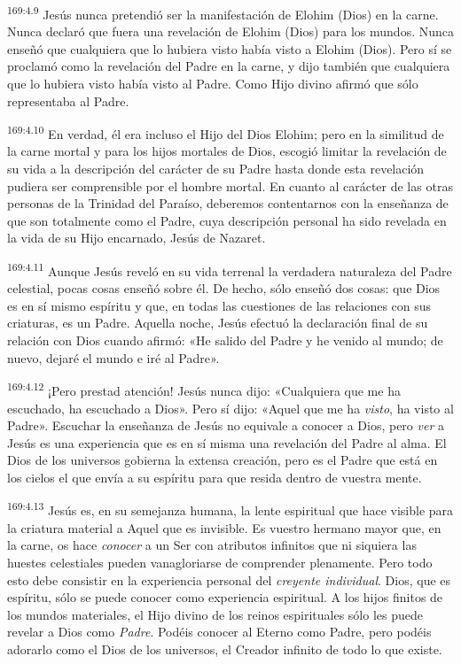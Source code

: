 \par 
\textsuperscript{169:4.9} Jesús nunca pretendió ser la manifestación de Elohim (Dios) en la carne. Nunca declaró que fuera una revelación de Elohim (Dios) para los mundos. Nunca enseñó que cualquiera que lo hubiera visto había visto a Elohim (Dios). Pero sí se proclamó como la revelación del Padre en la carne, y dijo también que cualquiera que lo hubiera visto había visto al Padre. Como Hijo divino afirmó que sólo representaba al Padre.

\par 
\textsuperscript{169:4.10} En verdad, él era incluso el Hijo del Dios Elohim; pero en la similitud de la carne mortal y para los hijos mortales de Dios, escogió limitar la revelación de su vida a la descripción del carácter de su Padre hasta donde esta revelación pudiera ser comprensible por el hombre mortal. En cuanto al carácter de las otras personas de la Trinidad del Paraíso, deberemos contentarnos con la enseñanza de que son totalmente como el Padre, cuya descripción personal ha sido revelada en la vida de su Hijo encarnado, Jesús de Nazaret.

\par 
\textsuperscript{169:4.11} Aunque Jesús reveló en su vida terrenal la verdadera naturaleza del Padre celestial, pocas cosas enseñó sobre él. De hecho, sólo enseñó dos cosas: que Dios es en sí mismo espíritu y que, en todas las cuestiones de las relaciones con sus criaturas, es un Padre. Aquella noche, Jesús efectuó la declaración final de su relación con Dios cuando afirmó: «He salido del Padre y he venido al mundo; de nuevo, dejaré el mundo e iré al Padre».

\par 
\textsuperscript{169:4.12} ¡Pero prestad atención! Jesús nunca dijo: «Cualquiera que me ha escuchado, ha escuchado a Dios». Pero sí dijo: «Aquel que me ha \textit{visto}, ha visto al Padre». Escuchar la enseñanza de Jesús no equivale a conocer a Dios, pero \textit{ver} a Jesús es una experiencia que es en sí misma una revelación del Padre al alma. El Dios de los universos gobierna la extensa creación, pero es el Padre que está en los cielos el que envía a su espíritu para que resida dentro de vuestra mente.

\par 
\textsuperscript{169:4.13} Jesús es, en su semejanza humana, la lente espiritual que hace visible para la criatura material a Aquel que es invisible. Es vuestro hermano mayor que, en la carne, os hace \textit{conocer} a un Ser con atributos infinitos que ni siquiera las huestes celestiales pueden vanagloriarse de comprender plenamente. Pero todo esto debe consistir en la experiencia personal del \textit{creyente individual}. Dios, que es espíritu, sólo se puede conocer como experiencia espiritual. A los hijos finitos de los mundos materiales, el Hijo divino de los reinos espirituales sólo les puede revelar a Dios como \textit{Padre}. Podéis conocer al Eterno como Padre, pero podéis adorarlo como el Dios de los universos, el Creador infinito de todo lo que existe.